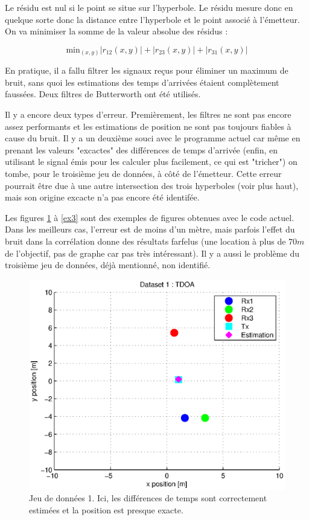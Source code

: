 \documentclass[10pt,a4paper]{article}
\begin{document}
Le résidu est nul si le point se situe sur l'hyperbole. Le résidu mesure donc en quelque sorte donc la distance entre l'hyperbole et le point associé à l'émetteur. On va minimiser la somme de la valeur absolue des résidus :

\begin{equation}
\mathrm{min}_{(x,y)} | r_{12}(x,y)| + |r_{23} (x,y)| + |r_{31} (x,y)|
\end{equation}

En pratique, il a fallu filtrer les signaux reçus pour éliminer un maximum de bruit, sans quoi les estimations des temps d'arrivées étaient complètement faussées. Deux filtres de Butterworth ont été utilisés.

Il y a encore deux types d'erreur. Premièrement, les filtres ne sont pas encore assez performants et les estimations de position ne sont pas toujours fiables à cause du bruit. Il y a un deuxième souci avec le programme actuel car même en prenant les valeurs "excactes" des différences de temps d'arrivée (enfin, en utilisant le signal émis pour les calculer plus facilement, ce qui est "tricher") on tombe, pour le troisième jeu de données, à côté de l'émetteur. Cette erreur pourrait être due à une autre intersection des trois hyperboles (voir plus haut), mais son origine excacte n'a pas encore été identifée.

Les figures \ref{ex1} à \ref{ex3} sont des exemples de figures obtenues avec le code actuel. Dans les meilleurs cas, l'erreur est de moins d'un mètre, mais parfois l'effet du bruit dans la corrélation donne des résultats farfelus (une location à plus de $70m$ de l'objectif, pas de graphe car pas très intéressant). Il y a aussi le problème du troisième jeu de données, déjà mentionné, non identifié.

\begin{figure}[h]
\centering
\includegraphics[scale = 0.5]{TDOA1}
\caption{Jeu de données 1. Ici, les différences de temps sont correctement estimées et la position est presque exacte.}
\label{ex1}
\end{figure}
\end{document}
